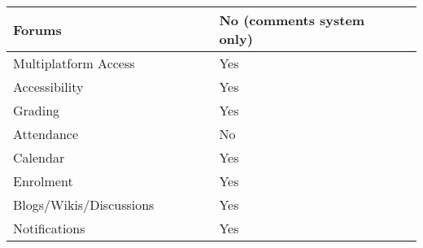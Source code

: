 \begin{table}[ht]
{\begin{tabular}{llllllll}
    \multicolumn{1}{|l|}{Forums}                      & \multicolumn{1}{l|}{} & \multicolumn{1}{l|}{} & \multicolumn{1}{l|}{} & \multicolumn{1}{l|}{} & \multicolumn{1}{l|}{No (comments system only)} & \multicolumn{1}{l|}{} & \multicolumn{1}{l|}{} \\ \hline
    \multicolumn{1}{|l|}{Multiplatform Access}        & \multicolumn{1}{l|}{} & \multicolumn{1}{l|}{} & \multicolumn{1}{l|}{} & \multicolumn{1}{l|}{} & \multicolumn{1}{l|}{Yes}                       & \multicolumn{1}{l|}{} & \multicolumn{1}{l|}{} \\ \hline
    \multicolumn{1}{|l|}{Accessibility}               & \multicolumn{1}{l|}{} & \multicolumn{1}{l|}{} & \multicolumn{1}{l|}{} & \multicolumn{1}{l|}{} & \multicolumn{1}{l|}{Yes}                       & \multicolumn{1}{l|}{} & \multicolumn{1}{l|}{} \\ \hline
    \multicolumn{1}{|l|}{Grading}                     & \multicolumn{1}{l|}{} & \multicolumn{1}{l|}{} & \multicolumn{1}{l|}{} & \multicolumn{1}{l|}{} & \multicolumn{1}{l|}{Yes}                       & \multicolumn{1}{l|}{} & \multicolumn{1}{l|}{} \\ \hline
    \multicolumn{1}{|l|}{Attendance}                  & \multicolumn{1}{l|}{} & \multicolumn{1}{l|}{} & \multicolumn{1}{l|}{} & \multicolumn{1}{l|}{} & \multicolumn{1}{l|}{No}                        & \multicolumn{1}{l|}{} & \multicolumn{1}{l|}{} \\ \hline
    \multicolumn{1}{|l|}{Calendar}                    & \multicolumn{1}{l|}{} & \multicolumn{1}{l|}{} & \multicolumn{1}{l|}{} & \multicolumn{1}{l|}{} & \multicolumn{1}{l|}{Yes}                       & \multicolumn{1}{l|}{} & \multicolumn{1}{l|}{} \\ \hline
    \multicolumn{1}{|l|}{Enrolment}                   & \multicolumn{1}{l|}{} & \multicolumn{1}{l|}{} & \multicolumn{1}{l|}{} & \multicolumn{1}{l|}{} & \multicolumn{1}{l|}{Yes}                       & \multicolumn{1}{l|}{} & \multicolumn{1}{l|}{} \\ \hline
    \multicolumn{1}{|l|}{Blogs/Wikis/Discussions}     & \multicolumn{1}{l|}{} & \multicolumn{1}{l|}{} & \multicolumn{1}{l|}{} & \multicolumn{1}{l|}{} & \multicolumn{1}{l|}{Yes}                       & \multicolumn{1}{l|}{} & \multicolumn{1}{l|}{} \\ \hline
    \multicolumn{1}{|l|}{Notifications}               & \multicolumn{1}{l|}{} & \multicolumn{1}{l|}{} & \multicolumn{1}{l|}{} & \multicolumn{1}{l|}{} & \multicolumn{1}{l|}{Yes}                       & \multicolumn{1}{l|}{} & \multicolumn{1}{l|}{} \\ \hline

\end{tabular}}
\end{table}
